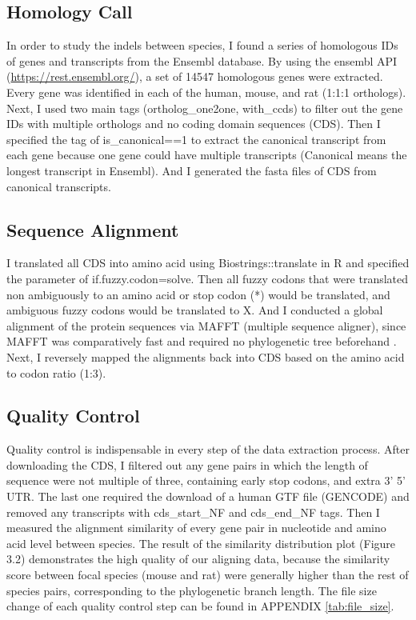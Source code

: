 \subsection{Homology Call}
In order to study the indels between species, I found a series of homologous IDs of genes and transcripts from the Ensembl database. By using the ensembl API (\href{https://rest.ensembl.org/}{https://rest.ensembl.org/}), a set of 14547 homologous genes were extracted. Every gene was identified in each of the human, mouse, and rat (1:1:1 orthologs). Next, I used two main tags (ortholog\_one2one, with\_ccds) to filter out the gene IDs with multiple orthologs and no coding domain sequences (CDS). Then I specified the tag of is\_canonical==1 to extract the canonical transcript from each gene because one gene could have multiple transcripts (Canonical means the longest transcript in Ensembl). And I generated the fasta files of CDS from canonical transcripts. 

\subsection{Sequence Alignment}
I translated all CDS into amino acid using Biostrings::translate in R and specified the parameter of if.fuzzy.codon=solve. Then all fuzzy codons that were translated non ambiguously to an amino acid or stop codon (*) would be translated, and ambiguous fuzzy codons would be translated to X. And I conducted a global alignment of the protein sequences via MAFFT (multiple sequence aligner), since MAFFT was comparatively fast and required no phylogenetic tree beforehand \parencite{katoh2005mafft}. Next, I reversely mapped the alignments back into CDS based on the amino acid to codon ratio (1:3).

\subsection{Quality Control}
Quality control is indispensable in every step of the data extraction process. After downloading the CDS, I filtered out any gene pairs in which the length of sequence were not multiple of three, containing early stop codons, and extra 3' 5' UTR. The last one required the download of a human GTF file (GENCODE) and removed any transcripts with cds\_start\_NF and  cds\_end\_NF tags. Then I measured the alignment similarity of every gene pair in nucleotide and amino acid level between species. The result of the similarity distribution plot (Figure 3.2) demonstrates the high quality of our aligning data, because the similarity score between focal species (mouse and rat) were generally higher than the rest of species pairs, corresponding to the phylogenetic branch length. The file size change of each quality control step can be found in APPENDIX \ref{tab:file_size}. 

